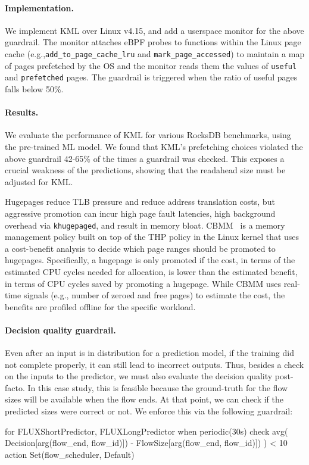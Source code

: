 \paragraph{Implementation.}
We implement KML over Linux v4.15, and add a userspace monitor for the above guardrail.
The monitor attaches eBPF probes to functions within the Linux page cache (e.g.,{\tt add_to_page_cache_lru} and {\tt mark_page_accessed}) to maintain a map of pages prefetched by the OS and the monitor reads them the values of {\tt useful} and {\tt prefetched} pages.
The guardrail is triggered when the ratio of useful pages falls below 50\%.

\paragraph{Results.}
We evaluate the performance of KML for various RocksDB benchmarks, using the pre-trained ML model. We found that KML's prefetching choices violated the above guardrail 42-65\% of the times a guardrail was checked. This exposes a crucial weakness of the predictions, showing that the readahead size must be adjusted for KML.


\iffalse
Hugepages reduce TLB pressure and reduce address translation costs, but aggressive promotion can incur high page fault latencies, high background overhead via \texttt{khugepaged}, and result in memory bloat.
CBMM~\cite{cbmm-atc22} is a memory management policy built on top of the THP policy in the Linux kernel that uses a cost-benefit analysis to decide which page ranges should be promoted to hugepages.
Specifically, a hugepage is only promoted if the cost, in terms of the estimated CPU cycles needed for allocation, is lower than the estimated benefit, in terms of CPU cycles saved by promoting a hugepage.
While CBMM uses real-time signals (e.g., number of zeroed and free pages) to estimate the cost, the benefits are profiled offline for the specific workload.


\paragraph{Decision quality guardrail.}
Even after an input is in distribution for a prediction model, if the training did not complete properly, it can still lead to incorrect outputs.
Thus, besides a check on the inputs to the predictor, we must also evaluate the decision quality post-facto.
In this case study, this is feasible because the ground-truth for the flow sizes will be available when the flow ends. At that point, we can check if the predicted sizes were correct or not. We enforce this via the following guardrail:
\begin{dslbox}[title={Guardrail~\theguardcount: FLUXDecisionQuality}, glabel=lst:flux-decision]
for FLUXShortPredictor, FLUXLongPredictor
when periodic(30s)
check avg(
      Decision[arg(flow_end, flow_id)]) -
      FlowSize[arg(flow_end, flow_id)])
  ) < 10%
action Set(flow_scheduler, Default)
\end{dslbox}

